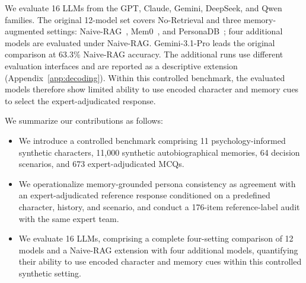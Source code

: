 \documentclass[11pt]{article}
\newcommand{\cmark}{\textcolor{green!60!black}{\ding{51}}}
\newcommand{\xmark}{\textcolor{red!70!black}{\ding{55}}}
\newcommand{\pmark}{\textcolor{orange!80!black}{\textbf{\textasciitilde}}}
\newcommand{\ourbench}[0]{\textsc{HEART-Bench}\xspace}
\begin{document}
We evaluate 16 LLMs from the GPT, Claude, Gemini, DeepSeek, and Qwen families. The original 12-model set covers No-Retrieval and three memory-augmented settings: Naive-RAG~\cite{lewis2020retrieval}, Mem0~\cite{chhikara2025mem0}, and PersonaDB~\cite{sun2025persona}; four additional models are evaluated under Naive-RAG. Gemini-3.1-Pro leads the original comparison at 63.3\% Naive-RAG accuracy. The additional runs use different evaluation interfaces and are reported as a descriptive extension (Appendix~\ref{app:decoding}). Within this controlled benchmark, the evaluated models therefore show limited ability to use encoded character and memory cues to select the expert-adjudicated response.


We summarize our contributions as follows:
\begin{itemize}[leftmargin=2em]
    \item We introduce a controlled benchmark comprising 11 psychology-informed synthetic characters, 11,000 synthetic autobiographical memories, 64 decision scenarios, and 673 expert-adjudicated MCQs.
    \item We operationalize memory-grounded persona consistency as agreement with an expert-adjudicated reference response conditioned on a predefined character, history, and scenario, and conduct a 176-item reference-label audit with the same expert team.
    \item We evaluate 16 LLMs, comprising a complete four-setting comparison of 12 models and a Naive-RAG extension with four additional models, quantifying their ability to use encoded character and memory cues within this controlled synthetic setting.
\end{itemize}


\end{document}
